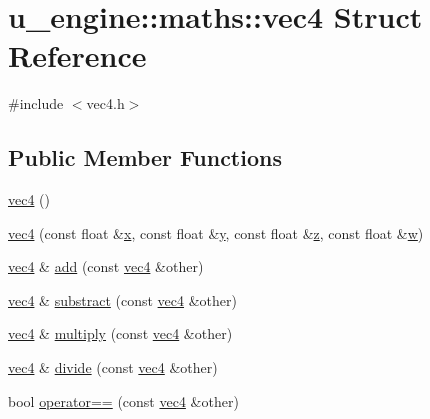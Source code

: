 \hypertarget{structu__engine_1_1maths_1_1vec4}{}\section{u\+\_\+engine\+:\+:maths\+:\+:vec4 Struct Reference}
\label{structu__engine_1_1maths_1_1vec4}


{\ttfamily \#include $<$vec4.\+h$>$}

\subsection*{Public Member Functions}
\begin{DoxyCompactItemize}
\item 
\hyperlink{structu__engine_1_1maths_1_1vec4_ab0c186a02c834bda66c046547de6814d}{vec4} ()
\item 
\hyperlink{structu__engine_1_1maths_1_1vec4_ad631a181d415966bb60ff6957d3e86f2}{vec4} (const float \&\hyperlink{glew_8h_ad77deca22f617d3f0e0eb786445689fc}{x}, const float \&\hyperlink{glew_8h_a9298c7ad619074f5285b32c6b72bfdea}{y}, const float \&\hyperlink{glew_8h_a826e1ac898f4ef56cea62219f74607db}{z}, const float \&\hyperlink{glew_8h_a433584688554d9a05d22844c39473968}{w})
\item 
\hyperlink{structu__engine_1_1maths_1_1vec4}{vec4} \& \hyperlink{structu__engine_1_1maths_1_1vec4_aa4235b88548c3fa37481b7486cfc80c5}{add} (const \hyperlink{structu__engine_1_1maths_1_1vec4}{vec4} \&other)
\item 
\hyperlink{structu__engine_1_1maths_1_1vec4}{vec4} \& \hyperlink{structu__engine_1_1maths_1_1vec4_ace7cc83f8c8ba43864caf8a5a508e175}{substract} (const \hyperlink{structu__engine_1_1maths_1_1vec4}{vec4} \&other)
\item 
\hyperlink{structu__engine_1_1maths_1_1vec4}{vec4} \& \hyperlink{structu__engine_1_1maths_1_1vec4_af65b36c890031315de94d474fa56f6fc}{multiply} (const \hyperlink{structu__engine_1_1maths_1_1vec4}{vec4} \&other)
\item 
\hyperlink{structu__engine_1_1maths_1_1vec4}{vec4} \& \hyperlink{structu__engine_1_1maths_1_1vec4_a52fd7b26797d488d2059acc885d56092}{divide} (const \hyperlink{structu__engine_1_1maths_1_1vec4}{vec4} \&other)
\item 
bool \hyperlink{structu__engine_1_1maths_1_1vec4_adef6410dbb61af15d95f8784a57b460c}{operator==} (const \hyperlink{structu__engine_1_1maths_1_1vec4}{vec4} \&other)
\item 

\end{DoxyCompactItemize}
